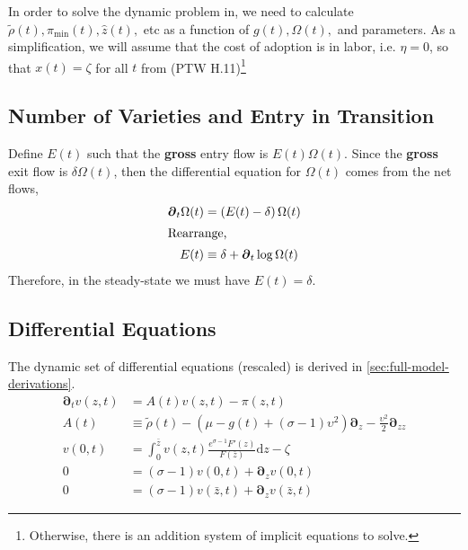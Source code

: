 \documentclass[11pt]{article}
\newcommand{\D}[1][]{\ensuremath{\boldsymbol{\partial}_{#1}}}
\newcommand{\diff}{\ensuremath{\mathrm{d}}}
\begin{document}
In order to solve the dynamic problem in, we need to calculate $\tilde{\rho}(t), \pi_{\min}(t),\hat{z}(t),$ etc  as a function of $g(t), \Omega(t),$ and parameters.  As a simplification, we will assume that the cost of adoption is in labor, i.e. $\eta = 0$, so that $x(t) = \zeta$ for all $t$ from (PTW H.11)\footnote{Otherwise, there is an addition system of implicit equations to solve.}  %

\subsection{Number of Varieties and Entry in Transition}

Define $E(t)$ such that the \textbf{gross} entry flow is $E(t)\Omega(t)$.  Since the \textbf{gross} exit flow is $\delta \Omega(t)$, then the differential equation for $\Omega(t)$ comes from the net flows,
\begin{align} \label{eq:E-defined-by-Omega}
	\D[t] \Omega(t) &= \left(E(t) - \delta \right)\Omega(t)\\
\intertext{Rearrange,}
E(t) &\equiv \delta + \D[t]\log \Omega(t)
\end{align}	
Therefore, in the steady-state we must have $E(t) = \delta$.

\subsection{Differential Equations}\label{sec:full-ODE}
The dynamic set of differential equations (rescaled) is derived in \cref{sec:full-model-derivations}.
\begin{align}
	\D[t]v(z,t) &= A(t)v(z,t) - \pi(z,t) \\	
	A(t) &\equiv \tilde{\rho}(t)  - (\mu - g(t) + (\sigma - 1)\upsilon^2)\D[z] - \frac{\upsilon^2}{2}\D[zz]\\
	v(0,t) &= \int_{0}^{\bar{z}}v(z,t) \frac{e^{\sigma - 1}F'(z)}{F(\bar{z})} \diff z - \zeta\\
	0 &= (\sigma - 1)v(0,t) + \D[z]v(0,t)\\
	0 &= (\sigma - 1)v(\bar{z},t) + \D[z]v(\bar{z},t)
\end{align}
\end{document}
